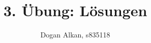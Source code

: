 \documentclass[a4paper,%
twoside,							%
headsepline = true,				%
footsepline = true,				%
headings=normal,
<<<<<<< HEAD
listof=totoc,					%
bibliography=totoc,			%
listof=entryprefix,
=======
listof = totoc,					%
bibliography = totoc,		%
listof = entryprefix,		%
>>>>>>> ff10663913a94aea2786594bebcc3acc7eb1273d
<<<<<<< HEAD
, draft
=======
>>>>>>> ff10663913a94aea2786594bebcc3acc7eb1273d
]
{scrartcl}
\begin{document}
\renewcommand*{\thesection}{\arabic{section}}
\renewcommand*{\thesubsection}{\alph{subsection}}
\renewcommand*{\thesubsubsection}{\arabic{subsubsection}}





\subject{\noindent\hrulefill\\ Multimediale Informationsverarbeitung}
\title{3. Übung: Lösungen}
\author{Dogan Alkan, s835118}
\date{\noindent\hrulefill}	\noindent						%
\maketitle 						%


\tableofcontents			%

\end{document}
